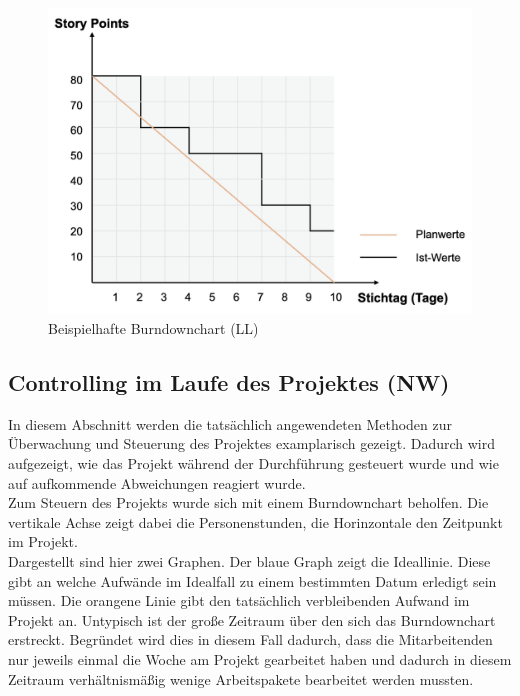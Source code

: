 \documentclass[ThesisDJ.tex]{subfiles}
\begin{document}
    \begin{figure}
        \includegraphics[scale=0.5]{burndown.png}
        \centering
        \caption{Beispielhafte Burndownchart (LL)}
        \label{fig:burndown}
    \end{figure}

    \subsection{Controlling im Laufe des Projektes (NW)}
    In diesem Abschnitt werden die tatsächlich angewendeten Methoden zur Überwachung und Steuerung des 
    Projektes examplarisch gezeigt. Dadurch wird aufgezeigt, wie das Projekt während der Durchführung gesteuert wurde 
    und wie auf aufkommende Abweichungen reagiert wurde.\\
    Zum Steuern des Projekts wurde sich mit einem Burndownchart beholfen. Die vertikale Achse zeigt dabei die Personenstunden, die Horinzontale den Zeitpunkt im Projekt.\\
Dargestellt sind hier zwei Graphen. Der blaue Graph zeigt die Ideallinie. Diese gibt an welche Aufwände im Idealfall zu einem bestimmten Datum erledigt sein müssen. Die orangene Linie gibt den tatsächlich verbleibenden Aufwand im Projekt an. Untypisch ist der große Zeitraum über den sich das Burndownchart erstreckt. Begründet wird dies in diesem Fall dadurch, dass die Mitarbeitenden nur jeweils einmal die Woche am Projekt gearbeitet haben und dadurch in diesem Zeitraum verhältnismäßig wenige Arbeitspakete bearbeitet werden mussten.
\end{document}
